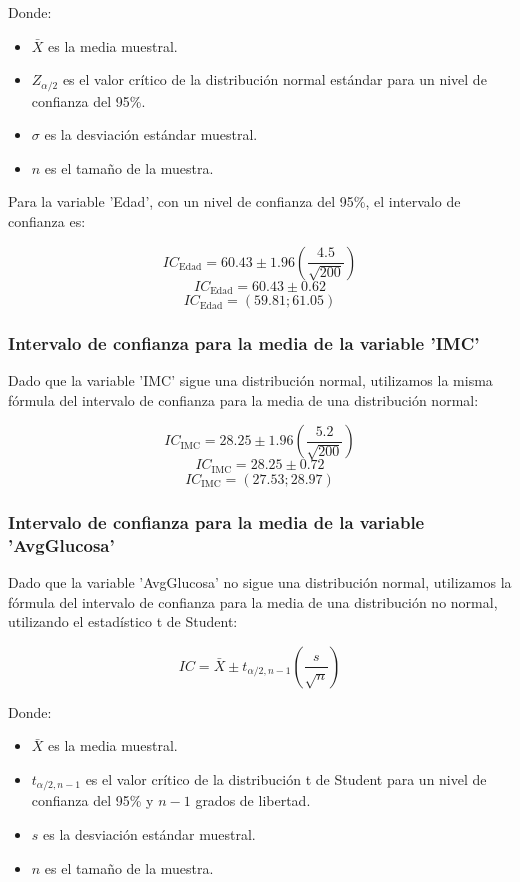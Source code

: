 \documentclass[a4paper, 12pt]{article}
\begin{document}
Donde:
\begin{itemize}
    \item $\bar{X}$ es la media muestral.
    \item $Z_{\alpha/2}$ es el valor crítico de la distribución normal estándar para un nivel de confianza del 95\%.
    \item $\sigma$ es la desviación estándar muestral.
    \item $n$ es el tamaño de la muestra.
\end{itemize}

Para la variable 'Edad', con un nivel de confianza del 95\%, el intervalo de confianza es:

\[ IC_{\text{Edad}} = 60.43 \pm 1.96 \left( \frac{4.5}{\sqrt{200}} \right) \]
\[ IC_{\text{Edad}} = 60.43 \pm 0.62 \]
\[ IC_{\text{Edad}} = ( 59.81;  61.05 ) \]

\subsubsection{Intervalo de confianza para la media de la variable 'IMC'}
Dado que la variable 'IMC' sigue una distribución normal, utilizamos la misma fórmula del intervalo de confianza para la media de una distribución normal:

\[ IC_{\text{IMC}} = 28.25 \pm 1.96 \left( \frac{5.2}{\sqrt{200}} \right) \]
\[ IC_{\text{IMC}} = 28.25 \pm 0.72 \]
\[ IC_{\text{IMC}} = ( 27.53 ; 28.97 ) \]

\subsubsection{Intervalo de confianza para la media de la variable 'AvgGlucosa'}
Dado que la variable 'AvgGlucosa' no sigue una distribución normal, utilizamos la fórmula del intervalo de confianza para la media de una distribución no normal, utilizando el estadístico t de Student:

\[ IC = \bar{X} \pm t_{\alpha/2, n-1} \left( \frac{s}{\sqrt{n}} \right) \]

Donde:
\begin{itemize}
    \item $\bar{X}$ es la media muestral.
    \item $t_{\alpha/2, n-1}$ es el valor crítico de la distribución t de Student para un nivel de confianza del 95\% y $n-1$ grados de libertad.
    \item $s$ es la desviación estándar muestral.
    \item $n$ es el tamaño de la muestra.
\end{itemize}
\end{document}
